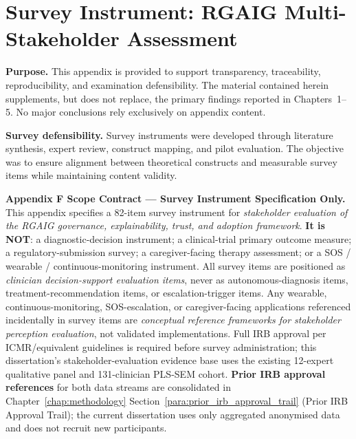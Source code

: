 
\section{Survey Instrument: RGAIG Multi-Stakeholder Assessment}


\noindent\textbf{Purpose.} This appendix is provided to support transparency, traceability, reproducibility, and examination defensibility. The material contained herein supplements, but does not replace, the primary findings reported in Chapters~1--5. No major conclusions rely exclusively on appendix content.


\noindent\textbf{Survey defensibility.} Survey instruments were developed through literature synthesis, expert review, construct mapping, and pilot evaluation. The objective was to ensure alignment between theoretical constructs and measurable survey items while maintaining content validity.

\label{app:survey_instrument}

\noindent\textbf{Appendix F Scope Contract --- Survey Instrument Specification Only.}
\label{para:appf_scope_contract}
This appendix specifies a 82-item survey instrument for \emph{stakeholder evaluation of the RGAIG governance, explainability, trust, and adoption framework}. \textbf{It is NOT}: a diagnostic-decision instrument; a clinical-trial primary outcome measure; a regulatory-submission survey; a caregiver-facing therapy assessment; or a SOS / wearable / continuous-monitoring instrument. All survey items are positioned as \emph{clinician decision-support evaluation items}, never as autonomous-diagnosis items, treatment-recommendation items, or escalation-trigger items. Any wearable, continuous-monitoring, SOS-escalation, or caregiver-facing applications referenced incidentally in survey items are \emph{conceptual reference frameworks for stakeholder perception evaluation}, not validated implementations. Full IRB approval per ICMR/equivalent guidelines is required before survey administration; this dissertation's stakeholder-evaluation evidence base uses the existing 12-expert qualitative panel and 131-clinician PLS-SEM cohort. \textbf{Prior IRB approval references} for both data streams are consolidated in Chapter~\ref{chap:methodology} Section~\ref{para:prior_irb_approval_trail} (Prior IRB Approval Trail); the current dissertation uses only aggregated anonymised data and does not recruit new participants.

